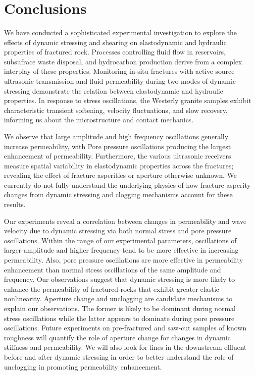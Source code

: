 
\section{Conclusions}
\paragraph{}
We have conducted a sophisticated experimental investigation to explore the effects of dynamic stressing and shearing on elastodynamic and hydraulic properties of fractured rock. Processes controlling fluid flow in reservoirs, subsufrace waste disposal, and hydrocarbon production derive from a complex interplay of these properties. Monitoring in-situ fractures with active source ultrasonic transmission and fluid permeability during two modes of dynamic stressing demonstrate the relation between elastodynamic and hydraulic properties. In response to stress oscillations, the Westerly granite samples exhibit characteristic transient softening, velocity fluctuations, and slow recovery, informing us about the microstructure and contact mechanics. 

We observe that large amplitude and high frequency oscillations generally increase permeability, with Pore pressure oscillations producing the largest enhancement of permeability. Furthermore, the various ultrasonic receivers measure spatial variability in elastodynamic properties across the fractures; revealing the effect of fracture asperities or aperture otherwise unknown. We currently do not fully understand the underlying physics of how fracture asperity changes from dynamic stressing and clogging mechanisms account for these results.




Our experiments reveal a correlation between changes in permeability and wave velocity due to dynamic stressing via both normal stress and pore pressure oscillations. Within the range of our experimental parameters, oscillations of larger-amplitude and higher frequency tend to be more effective in increasing permeability. Also, pore pressure oscillations are more effective in permeability enhancement than normal stress oscillations of the same amplitude and frequency. Our observations suggest that dynamic stressing is more likely to enhance the permeability of fractured rocks that exhibit greater elastic nonlinearity.
Aperture change and unclogging are candidate mechanisms to explain our observations. The former is likely to be dominant during normal stress oscillations while the latter appears to dominate during pore pressure oscillations. Future experiments on pre-fractured and saw-cut samples of known roughness will quantify the role of aperture change for changes in dynamic stiffness and permeability. We will also look for fines in the downstream effluent before and after dynamic stressing in order to better understand the role of unclogging in promoting permeability enhancement. 

